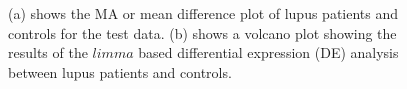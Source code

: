 \documentclass[a4paper, 12pt]{report}
\begin{document}
\begin{figure}[H]
    \centering
    \qquad    
    \caption{(a) shows the MA or mean difference plot of lupus patients and controls for the test data. (b) shows a volcano plot showing the results of the $limma$ based differential expression (DE) analysis between lupus patients and controls.}
    \label{F:BDVolcano}
\end{figure}
\end{document}
